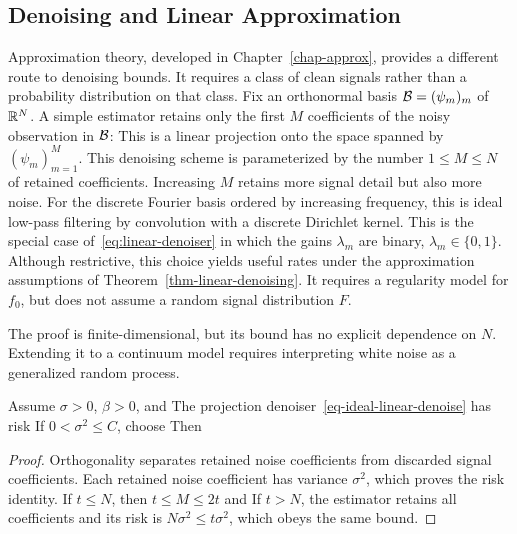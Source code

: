 \subsection{Denoising and Linear Approximation}

Approximation theory, developed in Chapter~\ref{chap-approx}, provides a different route to denoising bounds. It requires a class of clean signals rather than a probability distribution on that class.
%
Fix an orthonormal basis $\mathcal{B} = (\psi_m)_m$ of $\mathbb{R}^N$. A simple estimator retains only the first $M$ coefficients of the noisy observation in $\mathcal{B}$:
This is a linear projection onto the space spanned by $(\psi_m)_{m=1}^M$.
%
This denoising scheme is parameterized by the number $1\leq M\leq N$ of retained coefficients. Increasing $M$ retains more signal detail but also more noise.
%
For the discrete Fourier basis ordered by increasing frequency, this is ideal low-pass filtering by convolution with a discrete Dirichlet kernel.
%
This is the special case of~\eqref{eq:linear-denoiser} in which the gains $\lambda_m$ are binary, $\lambda_m \in \{0,1\}$. Although restrictive, this choice yields useful rates under the approximation assumptions of Theorem~\ref{thm-linear-denoising}. It requires a regularity model for $f_0$, but does not assume a random signal distribution $F$.

The proof is finite-dimensional, but its bound has no explicit dependence on $N$. Extending it to a continuum model requires interpreting white noise as a generalized random process.


\begin{thm}\label{thm-linear-denoising}
Assume $\sigma>0$, $\beta>0$, and
The projection denoiser~\eqref{eq-ideal-linear-denoise} has risk
If $0<\sigma^2\leq C$, choose
Then
\end{thm}
\begin{proof}
Orthogonality separates retained noise coefficients from discarded signal coefficients. Each retained noise coefficient has variance $\sigma^2$, which proves the risk identity. If $t\leq N$, then $t\leq M\leq2t$ and
If $t>N$, the estimator retains all coefficients and its risk is $N\sigma^2\leq t\sigma^2$, which obeys the same bound.
\end{proof}

